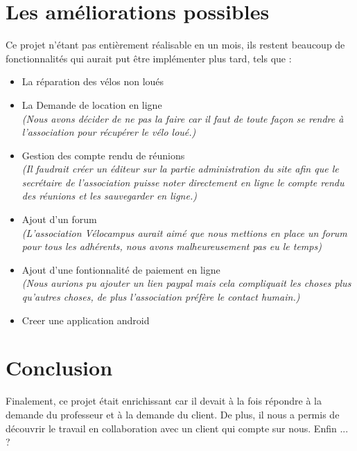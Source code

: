 \documentclass[11pt,a4paper,titlepage]{report}
\begin{document}
\chapter{Les améliorations possibles}
Ce projet n'étant pas entièrement réalisable en un mois, ils restent beaucoup de fonctionnalités qui aurait put être implémenter plus tard, tels que : \\
\begin{itemize}
\item La réparation des vélos non loués 
\item La Demande de location en ligne \\
\textit{(Nous avons décider de ne pas la faire car il faut de toute façon se rendre à l'association pour récupérer le vélo loué.)}
\item Gestion des compte rendu de réunions \\ \textit{(Il faudrait créer un éditeur sur la partie administration du site afin que le secrétaire de l'association puisse noter directement en ligne le compte rendu des réunions et les sauvegarder en ligne.)} 
\item Ajout d'un forum \\
\textit{(L'association Vélocampus aurait aimé que nous mettions en place un forum pour tous les adhérents, nous avons malheureusement pas eu le temps)} 
\item Ajout d'une fontionnalité de paiement en ligne \\
\textit{(Nous aurions pu ajouter un lien paypal mais cela compliquait les choses plus qu'autres choses, de plus l'association préfère le contact humain.)} 
\item Creer une application android
\end{itemize}
\chapter*{Conclusion}
Finalement, ce projet était enrichissant car il devait à la fois répondre à la demande du professeur et à la demande du client. 
De plus, il nous a permis de découvrir le travail en collaboration avec un client qui compte sur nous. Enfin ... ?
\end{document}
